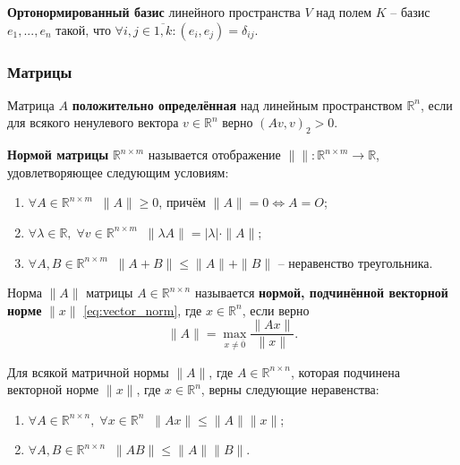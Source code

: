 \documentclass{article}
\begin{document}
\begin{define}
	\textbf{Ортонормированный базис} линейного пространства $V$ над полем
	$K$ -- базис $e_1,...,e_n$ такой, что
	$\forall i,j\in\overline{1,k}: (e_i,e_j)=\delta_{ij}$.
\end{define}

\subsubsection{Матрицы}
\begin{define}
	Матрица $A$ \textbf{положительно определённая} над линейным
	пространством $\mathbb R^n$, если для всякого ненулевого вектора
	$v\in \mathbb R^n$ верно $(Av, v)_2>0$.
\end{define}

\begin{define}
	\textbf{Нормой матрицы} $\mathbb R^{n\times m}$
	называется отображение $\|\|: \mathbb R^{n\times m}\rightarrow
	\mathbb R$, удовлетворяющее следующим условиям:
	\begin{enumerate}[nosep]
		\item $\forall A\in\mathbb R^{n\times m}\;\; \|A\|\ge 0$, причём
			$\|A\|=0\Leftrightarrow A=O$;
		\item $\forall \lambda\in \mathbb R,\;\forall v\in
			\mathbb R^{n\times m}\;\;
			\|\lambda A\|=|\lambda|\cdot\|A\|$;
		\item $\forall A,B\in\mathbb R^{n\times m}\;\; \|A+B\|\le
			\|A\|+\|B\|$ -- неравенство треугольника.
	\end{enumerate}
\end{define}

\begin{define}
	Норма $\|A\|$ матрицы $A\in \mathbb R^{n\times n}$ называется
	\textbf{нормой, подчинённой векторной норме} $\|x\|$
	\eqref{eq:vector_norm}, где $x\in \mathbb R^n$, если верно
	\[\|A\|=\max_{x\ne \overline{0}}\frac{\|Ax\|}{\|x\|}.\]
\end{define}

\begin{lemma}\label{eq:subordinate_norm_properties}
	Для всякой матричной нормы $\|A\|$, где $A\in\mathbb R^{n\times n}$,
	которая подчинена векторной норме $\|x\|$, где $x\in\mathbb R^n$, верны
	следующие неравенства:
	\begin{enumerate}[nosep]
		\item $\forall A\in\mathbb R^{n\times n},\;\forall x\in\mathbb
			R^n\;\; \|Ax\|\le\|A\|\|x\|$;
		\item $\forall A,B\in\mathbb R^{n\times n}\;\;
			\|AB\|\le\|A\|\|B\|$.
	\end{enumerate}
\end{lemma}
\end{document}
